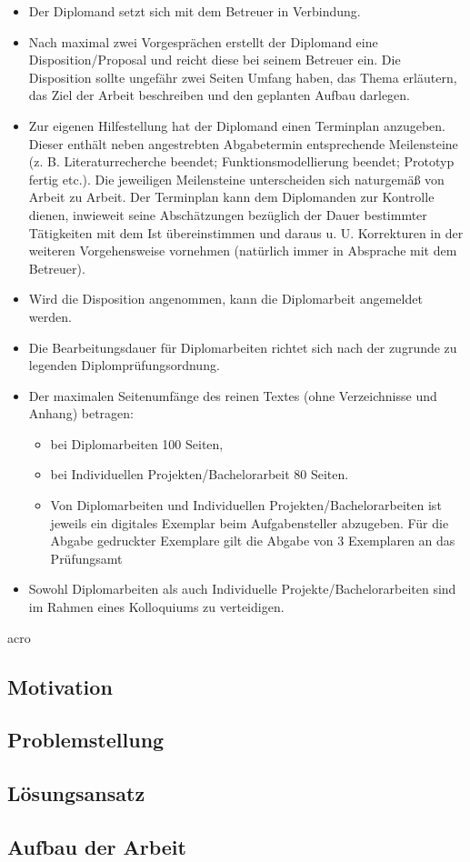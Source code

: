 \begin{itemize}
  \item Der Diplomand setzt sich mit dem Betreuer in Verbindung.
  \item Nach maximal zwei Vorgesprächen erstellt der Diplomand eine Disposition/Proposal  und reicht diese bei seinem Betreuer ein. Die Disposition sollte ungefähr zwei Seiten Umfang haben, das Thema erläutern, das Ziel der Arbeit beschreiben und den geplanten Aufbau darlegen.
  \item Zur eigenen Hilfestellung hat der Diplomand einen Terminplan anzugeben. Dieser enthält neben angestrebten Abgabetermin entsprechende Meilensteine (z. B. Literaturrecherche beendet; Funktionsmodellierung beendet; Prototyp fertig etc.). Die jeweiligen Meilensteine unterscheiden sich naturgemäß von Arbeit zu Arbeit. Der Terminplan kann dem Diplomanden zur Kontrolle dienen, inwieweit seine Abschätzungen bezüglich der Dauer bestimmter Tätigkeiten mit dem Ist übereinstimmen und daraus u. U. Korrekturen in der weiteren Vorgehensweise vornehmen (natürlich immer in Absprache mit dem Betreuer).
  \item Wird die Disposition angenommen, kann die Diplomarbeit angemeldet werden.
  \item Die Bearbeitungsdauer für Diplomarbeiten  richtet sich nach der zugrunde zu legenden Diplomprüfungsordnung.
  \item Der maximalen Seitenumfänge des reinen Textes (ohne Verzeichnisse und Anhang) betragen:
  \begin{itemize}
    \item bei Diplomarbeiten 100 Seiten,
    \item bei Individuellen Projekten/Bachelorarbeit 80 Seiten.
    \item Von Diplomarbeiten und Individuellen Projekten/Bachelorarbeiten ist jeweils ein digitales Exemplar beim Aufgabensteller abzugeben. Für die Abgabe gedruckter Exemplare gilt die Abgabe von 3 Exemplaren an das Prüfungsamt
  \end{itemize}
  \item Sowohl Diplomarbeiten als auch Individuelle Projekte/Bachelorarbeiten sind im Rahmen eines Kolloquiums zu verteidigen.
\end{itemize}

\acf{acro}

\subsection{Motivation}
\textcolor{red}{\blindtext}

\subsection{Problemstellung}
\textcolor{red}{\blindtext}

\subsection{Lösungsansatz}
\textcolor{red}{\blindtext}

\subsection{Aufbau der Arbeit}
\textcolor{red}{\blindtext}
